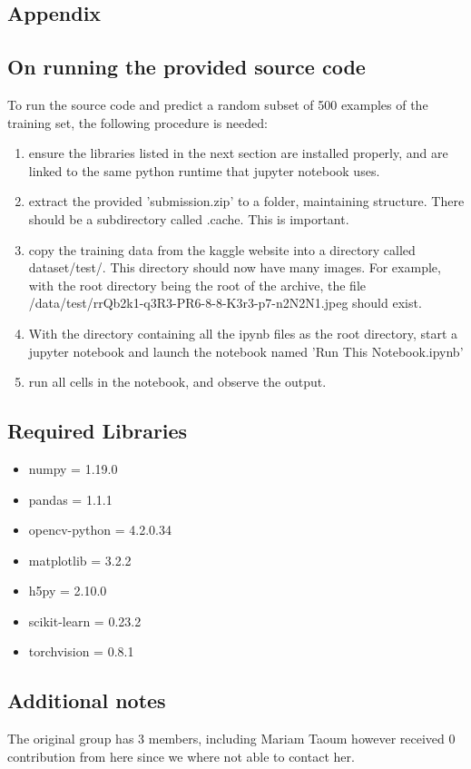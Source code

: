 \documentclass{article}
\begin{document}
\cleardoublepage
\begin{appendix}
\section{Appendix}
\subsection{On running the provided source code}
To run the source code and predict a random subset of 500 examples of the training set, the following procedure is needed:
\begin{enumerate}
    \item ensure the libraries listed in the next section are installed properly, and are linked to the same python runtime that jupyter notebook uses.
    \item extract the provided 'submission.zip' to a folder, maintaining structure. There should be a subdirectory called .cache. This is important.
    \item copy the training data from the kaggle website \cite{kaggle} into a directory called dataset/test/. This directory should now have many images. For example, with the root directory being the root of the archive, the file /data/test/rrQb2k1-q3R3-PR6-8-8-K3r3-p7-n2N2N1.jpeg should exist.
    \item With the directory containing all the ipynb files as the root directory, start a jupyter notebook and launch the notebook named 'Run This Notebook.ipynb'
    \item run all cells in the notebook, and observe the output.
\end{enumerate}
\subsection{Required Libraries}
\begin{itemize}
    \item numpy = 1.19.0
    \item pandas = 1.1.1
    \item opencv-python = 4.2.0.34
    \item matplotlib = 3.2.2
    \item h5py = 2.10.0
    \item scikit-learn = 0.23.2
    \item torchvision = 0.8.1
\end{itemize}
\subsection{Additional notes}
The original group has 3 members, including Mariam Taoum however received 0 contribution from here since we where not able to contact her.

\end{appendix}
\end{document}
